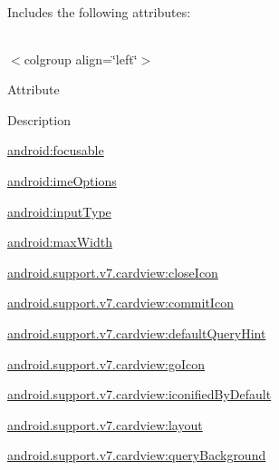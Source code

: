 Includes the following attributes\+:

\tabulinesep=1mm
\begin{longtabu} spread 0pt [c]{*{0}{|X[-1]}|}
\hline
\end{longtabu}
$<$colgroup align=\char`\"{}left\char`\"{}$>$ 

Attribute

Description 

{\ttfamily \hyperlink{classandroid_1_1support_1_1v7_1_1cardview_1_1R_1_1styleable_a373cce5ff29cfc7b5f134b1c22ec9cf9}{android\+:focusable}}

{\ttfamily \hyperlink{classandroid_1_1support_1_1v7_1_1cardview_1_1R_1_1styleable_a88aa7140c27a7ac4cbbf1fb9a313c348}{android\+:ime\+Options}}

{\ttfamily \hyperlink{classandroid_1_1support_1_1v7_1_1cardview_1_1R_1_1styleable_aad762769d154383461f4a4017db66413}{android\+:input\+Type}}

{\ttfamily \hyperlink{classandroid_1_1support_1_1v7_1_1cardview_1_1R_1_1styleable_a8ef58ace9eb6163c2db55365aeb93834}{android\+:max\+Width}}

{\ttfamily \hyperlink{classandroid_1_1support_1_1v7_1_1cardview_1_1R_1_1styleable_a0cf54fb2b0b8469da1416f865524d537}{android.\+support.\+v7.\+cardview\+:close\+Icon}}

{\ttfamily \hyperlink{classandroid_1_1support_1_1v7_1_1cardview_1_1R_1_1styleable_a866623cc5ff182b4597adf1f4472b817}{android.\+support.\+v7.\+cardview\+:commit\+Icon}}

{\ttfamily \hyperlink{classandroid_1_1support_1_1v7_1_1cardview_1_1R_1_1styleable_a66b7049f102d587dd7b8ce1ae08d136e}{android.\+support.\+v7.\+cardview\+:default\+Query\+Hint}}

{\ttfamily \hyperlink{classandroid_1_1support_1_1v7_1_1cardview_1_1R_1_1styleable_ae419f144558b1d2950fe533ade9e622a}{android.\+support.\+v7.\+cardview\+:go\+Icon}}

{\ttfamily \hyperlink{classandroid_1_1support_1_1v7_1_1cardview_1_1R_1_1styleable_ae4178ec746e562d89135b15a735ff968}{android.\+support.\+v7.\+cardview\+:iconified\+By\+Default}}

{\ttfamily \hyperlink{classandroid_1_1support_1_1v7_1_1cardview_1_1R_1_1styleable_afaa092a1521b8271596ff81f5a983464}{android.\+support.\+v7.\+cardview\+:layout}}

{\ttfamily \hyperlink{classandroid_1_1support_1_1v7_1_1cardview_1_1R_1_1styleable_ae43f966eb36b57de8bdb6ddadf0097ad}{android.\+support.\+v7.\+cardview\+:query\+Background}}

